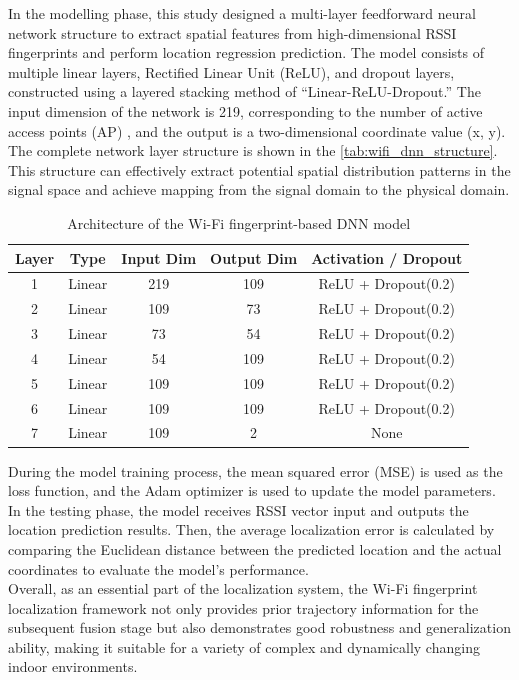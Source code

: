 \documentclass[12pt,a4paper]{article}
\numberwithin{equation}{section}
\begin{document}
\noindent In the modelling phase, this study designed a multi-layer feedforward neural network structure to extract spatial features from high-dimensional RSSI fingerprints and perform location regression prediction. The model consists of multiple linear layers, Rectified Linear Unit (ReLU), and dropout layers, constructed using a layered stacking method of “Linear-ReLU-Dropout.” The input dimension of the network is 219, corresponding to the number of active access points (AP) , and the output is a two-dimensional coordinate value (x, y). The complete network layer structure is shown in the \autoref{tab:wifi_dnn_structure}. This structure can effectively extract potential spatial distribution patterns in the signal space and achieve mapping from the signal domain to the physical domain.
\begin{table}[H]
\centering
\caption{Architecture of the Wi-Fi fingerprint-based DNN model}
\label{tab:wifi_dnn_structure}
\begin{tabular}{ccccc}
\toprule
\textbf{Layer} & \textbf{Type} & \textbf{Input Dim} & \textbf{Output Dim} & \textbf{Activation / Dropout} \\
\midrule
1 & Linear & 219  & 109 & ReLU + Dropout(0.2) \\
2 & Linear & 109  & 73  & ReLU + Dropout(0.2) \\
3 & Linear & 73   & 54  & ReLU + Dropout(0.2) \\
4 & Linear & 54   & 109 & ReLU + Dropout(0.2) \\
5 & Linear & 109  & 109 & ReLU + Dropout(0.2) \\
6 & Linear & 109  & 109 & ReLU + Dropout(0.2) \\
7 & Linear & 109  & 2   & None \\
\bottomrule
\end{tabular}
\end{table}


\noindent During the model training process, the mean squared error (MSE)  is used as the loss function, and the Adam optimizer is used to update the model parameters. In the testing phase, the model receives RSSI vector input and outputs the location prediction results. Then, the average localization error is calculated by comparing the Euclidean distance between the predicted location and the actual coordinates to evaluate the model's performance.\\
Overall, as an essential part of the localization system, the Wi-Fi fingerprint localization framework not only provides prior trajectory information for the subsequent fusion stage but also demonstrates good robustness and generalization ability, making it suitable for a variety of complex and dynamically changing indoor environments.
\end{document}
